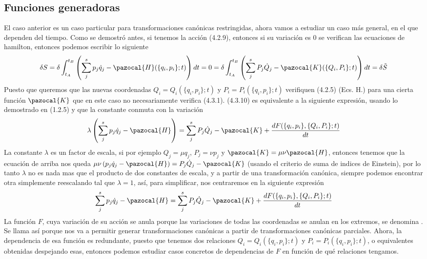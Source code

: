 \subsection{Funciones generadoras}
El caso anterior es un caso particular para transformaciones canónicas restringidas, ahora vamos a estudiar un caso más general, en el que dependen del tiempo. Como se demostró antes, si tenemos la acción (4.2.9), entonces si su variación es $0$ se verifican las ecuaciones de hamilton, entonces podemos escribir lo siguiente
\begin{equation} \label{4.2.7}
    \delta S = \delta\int_{t_A}^{t_B} \left(\sum_j^s p_j \dot{q}_j -\pazocal{H}(\{q_i,p_i\};t)\right) dt = 0 = \delta\int_{t_A}^{t_B} \left(\sum_j^s P_j \dot{Q}_j -\pazocal{K}(\{Q_i,P_i\};t)\right) dt = \delta \tilde{S}
\end{equation} 
Puesto que queremos que las nuevas coordenadas $Q_i=Q_i(\{q_i,p_i\};t)$ y $P_i=P_i(\{q_i,p_i\};t)$ verifiquen (4.2.5) (Ecs. H.) para una cierta función $\pazocal{K}$ que en este caso no necesariamente verifica (4.3.1). (4.3.10) es equivalente a la siguiente expresión, usando lo demostrado en (1.2.5) y que la constante conmuta con la variación
\begin{equation} \label{4.2.7}
    \lambda\left(\sum_j^s p_j \dot{q}_j -\pazocal{H}\right) = \sum_j^s P_j \dot{Q}_j -\pazocal{K} +  \frac{dF(\{q_i,p_i\},\{Q_i,P_i\};t)}{dt}
\end{equation} 
La constante $\lambda$ es un factor de escala, si por ejemplo $Q_j = \mu q_j$, $P_j = \nu p_j$ y $\pazocal{K} = \mu \nu \pazocal{H}$, entonces tenemos que la ecuación de arriba nos queda $\mu\nu\left(p_j \dot{q}_j -\pazocal{H}\right) = P_j \dot{Q}_j -\pazocal{K}$ (usando el criterio de suma de indices de Einstein), por lo tanto $\lambda$ no es nada mas que el producto de dos constantes de escala, y a partir de una transformación canónica, siempre podemos encontrar otra simplemente reescalando tal que $\lambda = 1$, así, para simplificar, nos centraremos en la siguiente expresión 
\begin{equation} \label{4.2.7}
    \sum_j^s p_j \dot{q}_j -\pazocal{H} = \sum_j^s P_j \dot{Q}_j -\pazocal{K} + \frac{dF(\{q_i,p_i\},\{Q_i,P_i\};t)}{dt}
\end{equation} 
La función $F$, cuya variación de su acción se anula porque las variaciones de todas las coordenadas se anulan en los extremos, se denomina . Se llama así porque nos va a permitir generar transformaciones canónicas a partir de transformaciones canónicas parciales.
\newpage
Ahora, la dependencia de esa función es redundante, puesto que tenemos dos relaciones $Q_i=Q_i(\{q_i,p_i\};t)$ y $P_i=P_i(\{q_i,p_i\};t)$, o equivalentes obtenidas despejando esas, entonces podemos estudiar casos concretos de dependencias de $F$ en función de qué relaciones tengamos.

